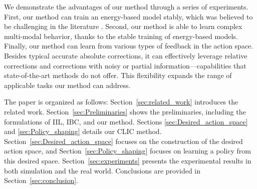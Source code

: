 

We demonstrate the advantages of our method through a series of experiments. 
First, our method can train an energy-based model stably, which was believed to be challenging in the literature \cite{2023_diffusionpolicy, 2022_arxiv_IBC_gaps, 2019_EBM_Du_Yilun}.  
Second, our method is able to learn complex multi-modal behavior, thanks to the stable training of energy-based models.
Finally, our method can learn from various types of feedback in the action space. 
Besides typical accurate absolute corrections, it can effectively leverage relative corrections and corrections with noisy or partial information—capabilities that state-of-the-art methods do not offer.
This flexibility expands the range of applicable tasks our method can address.

The paper is organized as follows:
Section~\ref{sec:related_work} introduces the related work.
Section~\ref{sec:Preliminaries} shows the preliminaries, including the formulations of IIL, IBC, and our method.
Sections \ref{sec:Desired_action_space} and \ref{sec:Policy_shaping} details our CLIC method. Section~\ref{sec:Desired_action_space} focuses on the construction of the desired action space, and Section~\ref{sec:Policy_shaping} focuses on learning a policy from this desired space.
Section~\ref{sec:experiments} presents the experimental results in both simulation and the real world.
Conclusions are provided in Section~\ref{sec:conclusion}. 

